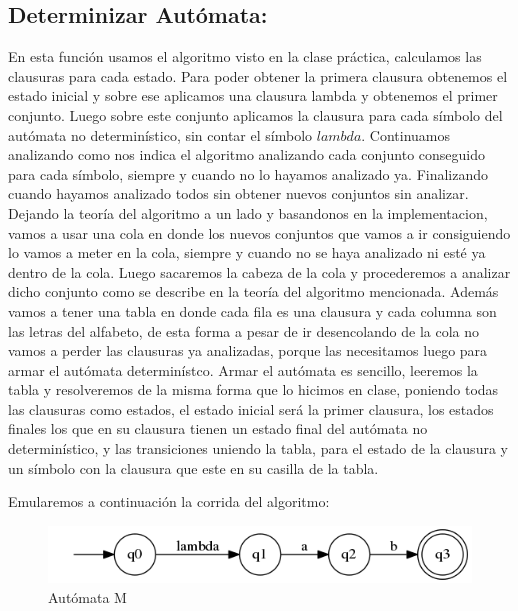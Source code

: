 \subsection{Determinizar Autómata:}
En esta función usamos el algoritmo visto en la clase práctica, calculamos las clausuras para cada estado.\newline
Para poder obtener la primera clausura obtenemos el estado inicial y sobre ese aplicamos una clausura lambda y obtenemos el primer conjunto. Luego sobre este conjunto aplicamos la clausura para cada símbolo del autómata no determinístico, sin contar el símbolo $lambda$.\newline
Continuamos analizando como nos indica el algoritmo analizando cada conjunto conseguido para cada símbolo, siempre y cuando no lo hayamos analizado ya.
Finalizando cuando hayamos analizado todos sin obtener nuevos conjuntos sin analizar.\newline
Dejando la teoría del algoritmo a un lado y basandonos en la implementacion, vamos a usar una cola en donde los nuevos conjuntos que vamos a ir consiguiendo lo vamos a meter en la cola, siempre y cuando no se haya analizado ni esté ya dentro de la cola. Luego sacaremos la cabeza de la cola y procederemos a analizar dicho conjunto como se describe en la teoría del algoritmo mencionada.\newline
Además vamos a tener una tabla en donde cada fila es una clausura y cada columna son las letras del alfabeto, de esta forma a pesar de ir desencolando de la cola no vamos a perder las clausuras ya analizadas, porque las necesitamos luego para armar el autómata determinístco. Armar el autómata es sencillo, leeremos la tabla y resolveremos de la misma forma que lo hicimos en clase, poniendo todas las clausuras como estados, el estado inicial será la primer clausura, los estados finales los que en su clausura tienen un estado final del autómata no determinístico, y las transiciones uniendo la tabla, para el estado de la clausura y un símbolo con la clausura que este en su casilla de la tabla.

\vspace{5 mm}
Emularemos a continuación la corrida del algoritmo:
\vspace{5 mm}

\begin{figure}[!h]
  \begin{center}
        \includegraphics[scale = 0.5]{images/inicial.png}
      \caption{Autómata M}
      \label{fig:contra1}
  \end{center}
\end{figure}

